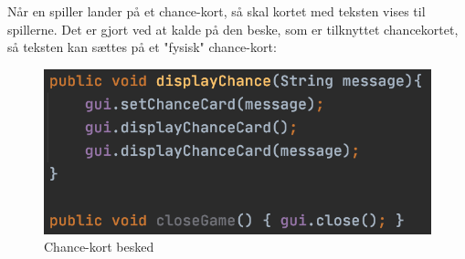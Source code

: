Når en spiller lander på et chance-kort, så skal kortet med teksten vises til spillerne. Det er gjort ved at kalde på den beske, som er tilknyttet chancekortet, så teksten kan sættes på et "fysisk" chance-kort:
\begin{figure}[H]
    \centering
    \includegraphics{sources/7_implementering/GameGUIdisplayChance.png}
    \caption{Chance-kort besked}
    \label{fig:playerListklasse}
\end{figure}

